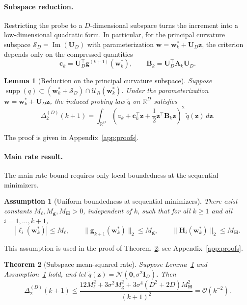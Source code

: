 \documentclass{article}
\newtheorem{assumption}{Assumption}
\newtheorem{theorem}{Theorem}
\newtheorem{lemma}[theorem]{Lemma}
\begin{document}
\paragraph{Subspace reduction.}
Restricting the probe to a $D$-dimensional subspace turns the increment into a low-dimensional quadratic form. In particular, for the principal curvature subspace $\mathcal S_D=\operatorname{Im}(\mathbf U_D)$ with parameterization $\mathbf w=\mathbf w_k^*+\mathbf U_D\mathbf z$, the criterion depends only on the compressed quantities
\[
\mathbf c_k=\mathbf U_D^\top\mathbf g^{(k+1)}(\mathbf w_k^*),
\qquad
\mathbf B_k=\mathbf U_D^\top\mathbf A_k\mathbf U_D.
\]

\begin{lemma}[Reduction on the principal curvature subspace]
\label{lem:subspace-reduction}
Suppose $\operatorname{supp}(q)\subset (\mathbf w_k^*+\mathcal S_D)\cap \mathcal U_R(\mathbf w_k^*)$. Under the parameterization $\mathbf w=\mathbf w_k^*+\mathbf U_D\mathbf z$, the induced probing law $\tilde q$ on $\mathbb R^D$ satisfies
\begin{equation}
\label{eq:subspace-reduction-integral}
\Delta_2^{(D)}(k+1)
=
\int_{\mathbb R^D}
\left(
a_k + \mathbf c_k^\top \mathbf z + \frac12 \mathbf z^\top \mathbf B_k \mathbf z
\right)^2
\, \tilde q(\mathbf z)\, d\mathbf z.
\end{equation}
\end{lemma}
The proof is given in Appendix~\ref{app:proofs}.

\paragraph{Main rate result.}
The main rate bound requires only local boundedness at the sequential minimizers.

\begin{assumption}[Uniform boundedness at sequential minimizers]
\label{ass:uniform-bounds}
There exist constants $M_\ell, M_{\mathbf g}, M_{\mathbf H}>0$, independent of $k$, such that for all $k\ge 1$ and all $i=1,\dots,k+1$,
\[
|\ell_i(\mathbf w_k^*)| \le M_\ell,
\qquad
\|\mathbf g_{k+1}(\mathbf w_k^*)\|_2 \le M_{\mathbf g},
\qquad
\|\mathbf H_i(\mathbf w_k^*)\|_2 \le M_{\mathbf H}.
\]
\end{assumption}
This assumption is used in the proof of Theorem~\ref{thm:subspace-rate}; see Appendix~\ref{app:proofs}.

\begin{theorem}[Subspace mean-squared rate]
\label{thm:subspace-rate}
Suppose Lemma~\ref{lem:subspace-reduction} and Assumption~\ref{ass:uniform-bounds} hold, and let $\tilde q(\mathbf z)=\mathcal N(\mathbf 0,\sigma^2\mathbf I_D)$. Then
\begin{equation}
\label{eq:subspace-rate-bound}
\Delta_2^{(D)}(k+1)
\le
\frac{
12M_\ell^2
+
3\sigma^2 M_{\mathbf g}^2
+
3\sigma^4(D^2+2D)M_{\mathbf H}^2
}{(k+1)^2}
=
\mathcal O(k^{-2}).
\end{equation}
\end{theorem}
\end{document}
